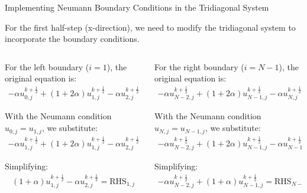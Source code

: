 \documentclass{beamer}
\begin{document}
\begin{frame}{Implementing Neumann Boundary Conditions in the Tridiagonal System}
    \vspace{-0.5cm}
    
    For the first half-step (x-direction), we need to modify the tridiagonal system to incorporate the boundary conditions.
    
    \begin{columns}
        \begin{column}{0.5\textwidth}
            \small
            For the left boundary ($i=1$), the original equation is:
            \begin{align*}
                -\alpha u_{0,j}^{k+\frac{1}{2}} + (1+2\alpha)u_{1,j}^{k+\frac{1}{2}} - \alpha u_{2,j}^{k+\frac{1}{2}} = \text{RHS}_{1,j}
            \end{align*}
            
            With the Neumann condition $u_{0,j} = u_{1,j}$, we substitute:
            \begin{align*}
                -\alpha u_{1,j}^{k+\frac{1}{2}} + (1+2\alpha)u_{1,j}^{k+\frac{1}{2}} - \alpha u_{2,j}^{k+\frac{1}{2}} = \text{RHS}_{1,j}
            \end{align*}
            
            Simplifying:
            \begin{align*}
                (1+\alpha)u_{1,j}^{k+\frac{1}{2}} - \alpha u_{2,j}^{k+\frac{1}{2}} = \text{RHS}_{1,j}
            \end{align*}
        \end{column}
        
        \begin{column}{0.5\textwidth}
            \small
            For the right boundary ($i=N-1$), the original equation is:
            \begin{align*}
                -\alpha u_{N-2,j}^{k+\frac{1}{2}} + (1+2\alpha)u_{N-1,j}^{k+\frac{1}{2}} - \alpha u_{N,j}^{k+\frac{1}{2}} = \text{RHS}_{N-1,j}
            \end{align*}
            
            With the Neumann condition $u_{N,j} = u_{N-1,j}$, we substitute:
            \begin{align*}
                -\alpha u_{N-2,j}^{k+\frac{1}{2}} + (1+2\alpha)u_{N-1,j}^{k+\frac{1}{2}} - \alpha u_{N-1,j}^{k+\frac{1}{2}} = \text{RHS}_{N-1,j}
            \end{align*}
            
            Simplifying:
            \begin{align*}
                -\alpha u_{N-2,j}^{k+\frac{1}{2}} + (1+\alpha)u_{N-1,j}^{k+\frac{1}{2}} = \text{RHS}_{N-1,j}
            \end{align*}
        \end{column}
    \end{columns}
\end{frame}
\end{document}

